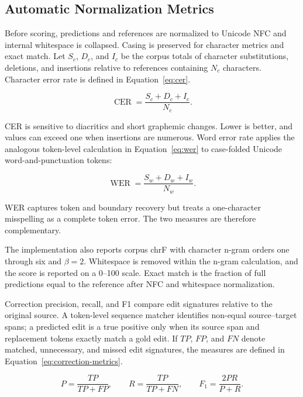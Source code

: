 \documentclass[12pt, a4paper, twoside, openany]{report}
\begin{document}
\subsection{Automatic Normalization Metrics}

Before scoring, predictions and references are normalized to Unicode NFC and internal whitespace is collapsed. Casing is preserved for character metrics and exact match. Let $S_c$, $D_c$, and $I_c$ be the corpus totals of character substitutions, deletions, and insertions relative to references containing $N_c$ characters. Character error rate is defined in Equation~\eqref{eq:cer}.

\begin{equation}
	\operatorname{CER}=\frac{S_c+D_c+I_c}{N_c}.
	\label{eq:cer}
\end{equation}

CER is sensitive to diacritics and short graphemic changes. Lower is better, and values can exceed one when insertions are numerous. Word error rate applies the analogous token-level calculation in Equation~\eqref{eq:wer} to case-folded Unicode word-and-punctuation tokens:

\begin{equation}
	\operatorname{WER}=\frac{S_w+D_w+I_w}{N_w}.
	\label{eq:wer}
\end{equation}

WER captures token and boundary recovery but treats a one-character misspelling as a complete token error. The two measures are therefore complementary.

The implementation also reports corpus chrF with character n-gram orders one through six and $\beta=2$. Whitespace is removed within the n-gram calculation, and the score is reported on a 0--100 scale. Exact match is the fraction of full predictions equal to the reference after NFC and whitespace normalization.

Correction precision, recall, and F1 compare edit signatures relative to the original source. A token-level sequence matcher identifies non-equal source--target spans; a predicted edit is a true positive only when its source span and replacement tokens exactly match a gold edit. If $TP$, $FP$, and $FN$ denote matched, unnecessary, and missed edit signatures, the measures are defined in Equation~\eqref{eq:correction-metrics}.

\begin{equation}
	P=\frac{TP}{TP+FP},\qquad
	R=\frac{TP}{TP+FN},\qquad
	F_1=\frac{2PR}{P+R}.
	\label{eq:correction-metrics}
\end{equation}
\end{document}
